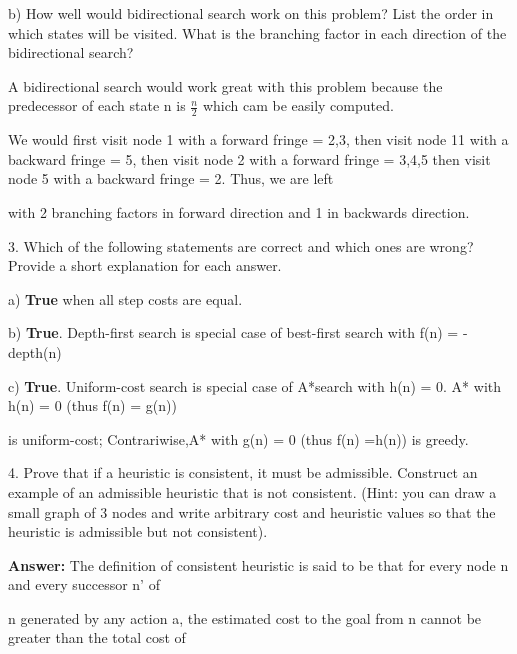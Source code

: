 \documentclass{article}
\begin{document}
\newline
\par
\setlength{\parindent}{30pt}
b)  How well would bidirectional search work on this problem? List the order in which states will be visited. 
\indent
What is the
branching factor in each direction of the bidirectional search?
\newline
\par
A bidirectional search would work great with this problem because the predecessor of each state n is $\frac{n}{2}$ 
\indent
which cam be easily computed.
\par
We would first visit node 1 with a forward fringe  = {2,3}, then visit node 11 with a backward fringe = {5}, then
\indent
visit node 2 with a forward fringe = {3,4,5} then visit node 5 with a backward fringe = {2}. Thus, we are left 
\par
with 2 branching factors in forward direction and 1 in backwards direction.
\newline
\setlength{\parindent}{0pt}
\par
3. Which of the following statements are correct and which ones are wrong? Provide a short explanation for each answer.
\par
\setlength{\parindent}{30pt}
a) \textbf{True} when all step costs are equal.
\newline
\par
b) \textbf{True}. Depth-first search is special case of best-first search with f(n) = -depth(n)
\newline
\par
c) \textbf{True}. Uniform-cost search is special case of A*search with h(n) = 0. A* with h(n) = 0 (thus f(n) = g(n)) 
\par
is uniform-cost; Contrariwise,A* with g(n) = 0 (thus f(n) =h(n)) is greedy.
\newline
\setlength{\parindent}{0pt}
\par
4. Prove that if a heuristic is consistent, it must be admissible. Construct an example of an admissible
heuristic that is not consistent. (Hint: you can draw a small graph of 3 nodes and write arbitrary cost and heuristic values
so that the heuristic is admissible but not consistent).
\par
\setlength{\parindent}{30pt}
\textbf{Answer:} The definition of consistent heuristic is said to be that for every node n and every successor n' of 
\par n generated by any action a, the estimated cost to the goal from n cannot be greater than the total cost of 
\end{document}
